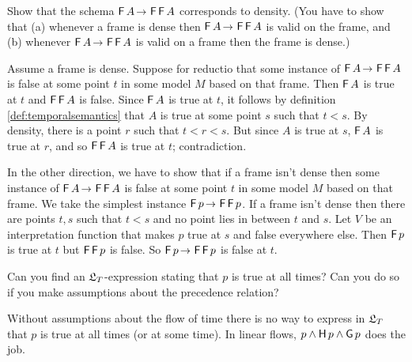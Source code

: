 \begin{exercise}
  Show that the schema $\tF A \to \tF\tF A$ corresponds to density. (You
  have to show that (a) whenever a frame is dense then $\tF A \to \tF\tF A$ is
  valid on the frame, and (b) whenever $\tF A \to \tF\tF A$ is valid on a frame
  then the frame is dense.)
\end{exercise}
\begin{solution}
  Assume a frame is dense. Suppose for reductio that some instance of
  $\tF A \to \tF\tF A$ is false at some point $t$ in some model $M$ based on
  that frame. Then $\operatorname{\mathsf{F}} A$ is true at $t$ and $\operatorname{\mathsf{F}}\operatorname{\mathsf{F}} A$ is false. Since $\operatorname{\mathsf{F}} A$
  is true at $t$, it follows by definition \ref{def:temporalsemantics} that $A$
  is true at some point $s$ such that $t<s$. By density, there is a point $r$
  such that $t<r<s$. But since $A$ is true at $s$, $\operatorname{\mathsf{F}} A$ is true at $r$, and
  so $\operatorname{\mathsf{F}}\operatorname{\mathsf{F}} A$ is true at $t$; contradiction.

  In the other direction, we have to show that if a frame isn't dense then some
  instance of $\tF A \to \tF\tF A$ is false at some point $t$ in some model $M$
  based on that frame. We take the simplest instance $\tF p \to \tF\tF p$. If a
  frame isn't dense then there are points $t,s$ such that $t<s$ and no point
  lies in between $t$ and $s$. Let $V$ be an interpretation function that makes
  $p$ true at $s$ and false everywhere else. Then $\operatorname{\mathsf{F}} p$ is true at $t$ but
  $\operatorname{\mathsf{F}}\operatorname{\mathsf{F}} p$ is false. So $\tF p \to \tF\tF p$ is false at $t$.
\end{solution}
\vspace{-2mm}

\begin{exercise}
  Can you find an $\mathfrak{L}_T$-expression stating that $p$ is true at all times? Can
  you do so if you make assumptions about the precedence relation?
\end{exercise}
\begin{solution}
  Without assumptions about the flow of time there is no way to express in
  $\mathfrak{L}_T$ that $p$ is true at all times (or at some time). In linear flows,
  $p \land \operatorname{\mathsf{H}} p \land \operatorname{\mathsf{G}} p$ does the job. 
\end{solution}


